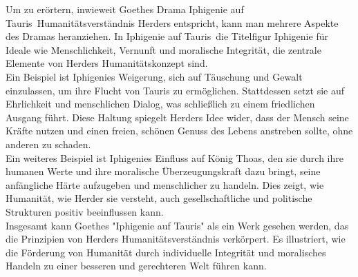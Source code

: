 \documentclass[12pt,a4paper]{report}
\begin{document}
	Um zu erörtern, inwieweit Goethes Drama \dq Iphigenie auf Tauris\dq\ Humanitätsverständnis Herders entspricht, kann man mehrere Aspekte des Dramas heranziehen. In \dq Iphigenie auf Tauris\dq\ die Titelfigur Iphigenie für Ideale wie Menschlichkeit, Vernunft und moralische Integrität, die zentrale Elemente von Herders Humanitätskonzept sind.
	\\
	Ein Beispiel ist Iphigenies Weigerung, sich auf Täuschung und Gewalt einzulassen, um ihre Flucht von Tauris zu ermöglichen.
	Stattdessen setzt sie auf Ehrlichkeit und menschlichen Dialog, was schließlich zu einem friedlichen Ausgang führt.
	Diese Haltung spiegelt Herders Idee wider, dass der Mensch seine Kräfte nutzen und einen freien, schönen Genuss des Lebens anstreben sollte, ohne anderen zu schaden.
	\\
	Ein weiteres Beispiel ist Iphigenies Einfluss auf König Thoas, den sie durch ihre humanen Werte und ihre moralische Überzeugungskraft dazu bringt, seine anfängliche Härte aufzugeben und menschlicher zu handeln.
	Dies zeigt, wie Humanität, wie Herder sie versteht, auch gesellschaftliche und politische Strukturen positiv beeinflussen kann.
	\\
	Insgesamt kann Goethes "Iphigenie auf Tauris" als ein Werk gesehen werden, das die Prinzipien von Herders Humanitätsverständnis verkörpert.
	Es illustriert, wie die Förderung von Humanität durch individuelle Integrität und moralisches Handeln zu einer besseren und gerechteren Welt führen kann.
\end{document}
